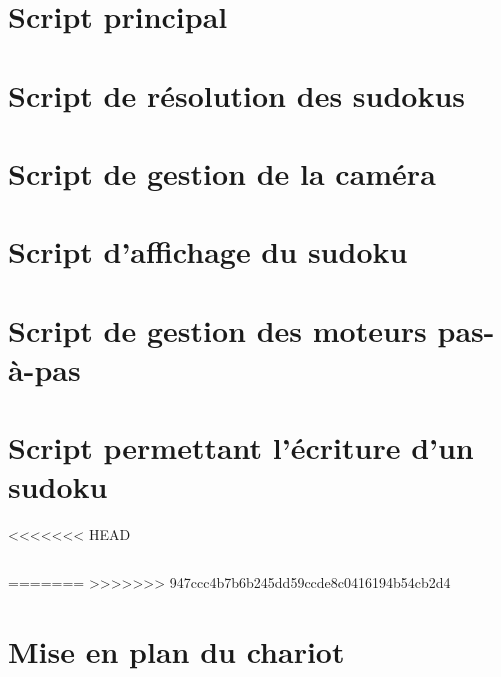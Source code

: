 \printbibliography
\nocite{*}
\appendix

\begin{changemargin}{-2cm}{-4cm}

\label{Scripts}
\chapter*{Script principal}
\label{main}

\chapter*{Script de résolution des sudokus}
\label{resolution}

\chapter*{Script de gestion de la caméra}
\label{camera}

\chapter*{Script d'affichage du sudoku}
\label{display}

\chapter*{Script de gestion des moteurs pas-à-pas}
\label{step_motor}

\chapter*{Script permettant l'écriture d'un sudoku}
\label{write}
<<<<<<< HEAD
\inputminted[fontsize=\scriptsize, linenos=true]{Python}{../script/write.py}

=======
>>>>>>> 947ccc4b7b6b245dd59ccde8c0416194b54cb2d4

\chapter*{Mise en plan du chariot}


\end{changemargin}
